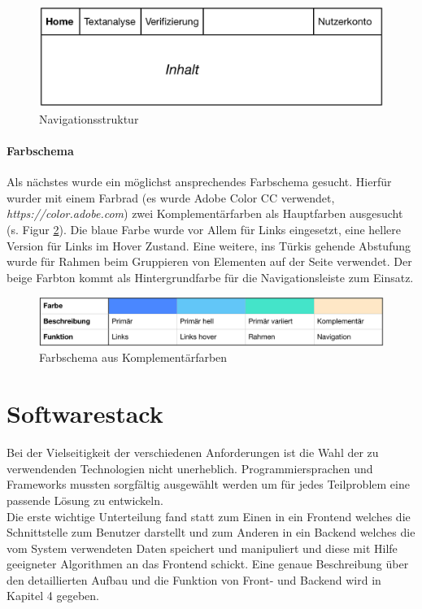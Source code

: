 \begin{figure}[h!]
	\centering
	\includegraphics[width=.8\linewidth]{figures/navigation}
	\caption{Navigationsstruktur}
	\label{fig:navigation}
\end{figure}

\paragraph{Farbschema}

Als nächstes wurde ein möglichst ansprechendes Farbschema gesucht. Hierfür wurder mit einem Farbrad (es wurde Adobe Color CC verwendet, \textit{https://color.adobe.com}) zwei Komplementärfarben als Hauptfarben ausgesucht (s. Figur \ref{fig:colors}). Die blaue Farbe wurde vor Allem für Links eingesetzt, eine hellere Version für Links im Hover Zustand. Eine weitere, ins Türkis gehende Abstufung wurde für Rahmen beim Gruppieren von Elementen auf der Seite verwendet. Der beige Farbton kommt als Hintergrundfarbe für die Navigationsleiste zum Einsatz.

\begin{figure}[h!]
	\centering
	\includegraphics[width=.95\linewidth]{figures/farbschema}
	\caption{Farbschema aus Komplementärfarben}
	\label{fig:colors}
\end{figure}






\section{Softwarestack}

Bei der Vielseitigkeit der verschiedenen Anforderungen ist die Wahl der zu verwendenden Technologien nicht unerheblich. Programmiersprachen und Frameworks mussten sorgfältig ausgewählt werden um für jedes Teilproblem eine passende Lösung zu entwickeln.\\
Die erste wichtige Unterteilung fand statt zum Einen in ein Frontend welches die Schnittstelle zum Benutzer darstellt und zum Anderen in ein Backend welches die vom System verwendeten Daten speichert und manipuliert und diese mit Hilfe geeigneter Algorithmen an das Frontend schickt. Eine genaue Beschreibung über den detaillierten Aufbau und die Funktion von Front- und Backend wird in Kapitel 4 gegeben.\\

